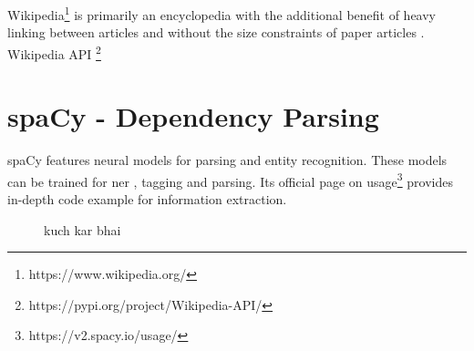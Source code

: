 Wikipedia\footnote{https://www.wikipedia.org/} is primarily an encyclopedia with the additional benefit of heavy linking between articles and without the size constraints of paper articles \cite{TorstenZesch}. Wikipedia API \footnote{https://pypi.org/project/Wikipedia-API/}

\section{spaCy - Dependency Parsing}

spaCy\cite{spacy2} features neural models for parsing and entity recognition. These models can be trained for \acf{ner} , tagging and parsing. Its official page on usage\footnote {https://v2.spacy.io/usage/} provides in-depth code example for information extraction.

\begin{figure}[htp!]
    \centering    
    
    \caption{kuch kar bhai}
    \label{fig:propn}
\end{figure}


